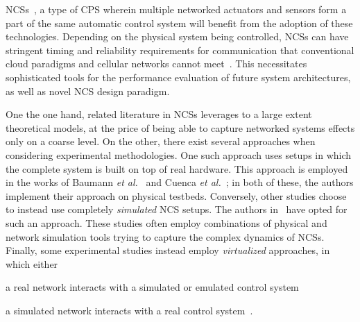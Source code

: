 \glspl{NCS}~\cite{Gupta2010NCSOverview}, a type of \gls{CPS} wherein multiple networked actuators and sensors form a part of the same automatic control system will benefit from the adoption of these technologies.
Depending on the physical system being controlled, \glspl{NCS} can have stringent timing and reliability requirements for communication that conventional cloud paradigms and cellular networks cannot meet~\cite{Wan2020Efficient}.
This necessitates sophisticated tools for the performance evaluation of future system architectures, as well as novel NCS design paradigm.


One the one hand, related literature in \glspl{NCS} leverages to a large extent theoretical models, at the price of being able to capture networked systems effects only on a coarse level.
On the other, there exist several approaches when considering experimental methodologies.
One such approach uses setups in which the complete system is built on top of real hardware.
This approach is employed in the works of Baumann \emph{et al.}~\cite{Baumann2018LowPower} and Cuenca \emph{et al.}~\cite{Cuenca2019UAV}; in both of these, the authors implement their approach on physical testbeds.
Conversely, other studies choose to instead use completely \emph{simulated} \gls{NCS} setups.
The authors in\ \cite{Ma2019DynamicSched} have opted for such an approach.
These studies often employ combinations of physical and network simulation tools trying to capture the complex dynamics of \glspl{NCS}.
Finally, some experimental studies instead employ \emph{virtualized} approaches, in which either
\begin{inlineenum}[itemjoin={{; }}, itemjoin*={{; or }}]
    \item a real network interacts with a simulated or emulated control system~\cite{Wang2020VoltageControl}
    \item a simulated network interacts with a real control system~\cite{Natale2004InvPendEthernet}.
\end{inlineenum}

